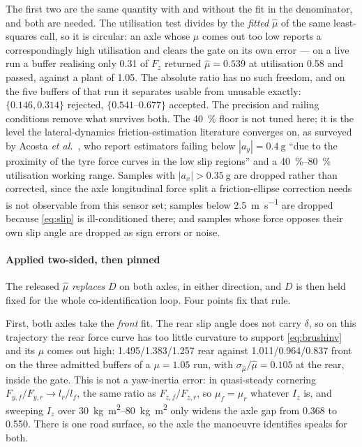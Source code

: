 The first two are the same quantity with and without the fit in the
denominator, and both are needed. The utilisation test divides by the
\emph{fitted} $\hat\mu$ of the same least-squares call, so it is circular: an
axle whose $\mu$ comes out too low reports a correspondingly high utilisation
and clears the gate on its own error --- on a live run a buffer realising only
\num{0.31} of $F_{z}$ returned $\hat\mu=\num{0.539}$ at utilisation \num{0.58}
and passed, against a plant of \num{1.05}. The absolute ratio has no such
freedom, and on the five buffers of that run it separates usable from unusable
exactly: $\{\num{0.146},\num{0.314}\}$ rejected,
$\{\numrange{0.541}{0.677}\}$ accepted. The precision and railing conditions
remove what survives both. The \SI{40}{\percent} floor is not tuned here; it is
the level the lateral-dynamics friction-estimation literature converges on, as
surveyed by Acosta \emph{et al.}~\cite{acosta2017friction}, who report
estimators failing below $|a_{y}|=\SI{0.4}{\g}$ ``due to the proximity of the
tyre force curves in the low slip regions'' and a \SIrange{40}{80}{\percent}
utilisation working range. Samples with $|a_{x}|>\SI{0.35}{\g}$ are dropped
rather than corrected, since the axle longitudinal force split a
friction-ellipse correction needs is not observable from this sensor set;
samples below \SI{2.5}{\meter\per\second} are dropped because \eqref{eq:slip}
is ill-conditioned there; and samples whose force opposes their own slip angle
are dropped as sign errors or noise.

\paragraph{Applied two-sided, then pinned}
\label{subsec:frictionfloor}
The released $\hat\mu$ \emph{replaces} $D$ on both axles, in either direction,
and $D$ is then held fixed for the whole co-identification loop. Four points
fix that rule.

First, both axles take the \emph{front} fit. The rear slip angle does not carry
$\delta$, so on this trajectory the rear force curve has too little curvature
to support \eqref{eq:brushinv} and its $\mu$ comes out high:
\num{1.495}/\num{1.383}/\num{1.257} rear against
\num{1.011}/\num{0.964}/\num{0.837} front on the three admitted buffers of a
$\mu=\num{1.05}$ run, with $\sigma_{\hat\mu}/\hat\mu=\num{0.105}$ at the rear,
inside the gate. This is not a yaw-inertia error: in quasi-steady cornering
$F_{y,f}/F_{y,r}\to l_{r}/l_{f}$, the same ratio as $F_{z,f}/F_{z,r}$, so
$\mu_{f}=\mu_{r}$ whatever $I_{z}$ is, and sweeping $I_{z}$ over
\SIrange{30}{80}{\kilo\gram\meter\squared} only widens the axle gap from
\num{0.368} to \num{0.550}. There is one road surface, so the axle the
manoeuvre identifies speaks for both.

